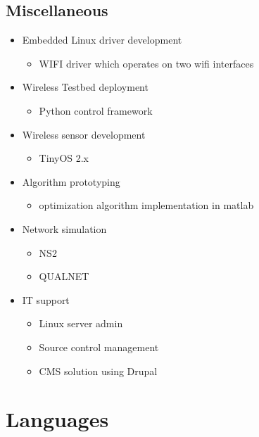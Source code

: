 \documentclass[11pt,a4paper,sans]{moderncv}        %
\begin{document}
\subsection{Miscellaneous}
\begin{itemize}%
\item Embedded Linux driver development
  \begin{itemize}%
  \item WIFI driver which operates on two wifi interfaces
  \end{itemize}
\item Wireless Testbed deployment
  \begin{itemize}%
  \item Python control framework
  \end{itemize}
\item Wireless sensor development
  \begin{itemize}%
  \item TinyOS 2.x
  \end{itemize}
\item Algorithm prototyping
  \begin{itemize}%
  \item optimization algorithm implementation in matlab
  \end{itemize}
\item Network simulation
  \begin{itemize}%
  \item NS2
  \item QUALNET
  \end{itemize}
\item IT support
  \begin{itemize}%
  \item Linux server admin
  \item Source control management
  \item CMS solution using Drupal
  \end{itemize}
\end{itemize}

\section{Languages}
\end{document}
